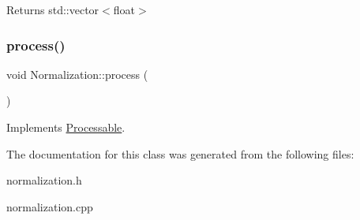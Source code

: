 \begin{DoxyReturn}{Returns}
std\+::vector$<$float$>$ 
\end{DoxyReturn}
\mbox{\label{classNormalization_a7666aa086ded5e86b4b5c330e49bab26}} 
\subsubsection{\texorpdfstring{process()}{process()}}
{\footnotesize\ttfamily void Normalization\+::process (\begin{DoxyParamCaption}{ }\end{DoxyParamCaption})\hspace{0.3cm}{\ttfamily [virtual]}}



Implements \hyperlink{classProcessable}{Processable}.



The documentation for this class was generated from the following files\+:\begin{DoxyCompactItemize}
\item 
normalization.\+h\item 
normalization.\+cpp\end{DoxyCompactItemize}
